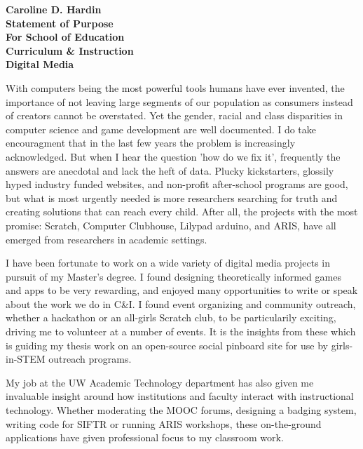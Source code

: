 \documentclass[12pt]{letter}
\begin{document}
\begin{letter}

\noindent 
\large\textbf{Caroline D. Hardin\\
Statement of Purpose\\
For School of Education\\
Curriculum \& Instruction\\
Digital Media
}
\vfill


\signature{Caroline D. Hardin} %


With computers being the most powerful tools humans have ever invented, the importance of not leaving large segments of our population as consumers instead of creators cannot be overstated. Yet the gender, racial and class disparities in computer science and game development are well documented. I do take encouragment that in the last few years the problem is increasingly acknowledged. But when I hear the question 'how do we fix it', frequently the answers are anecdotal and lack the heft of data. Plucky kickstarters, glossily hyped industry funded websites, and non-profit after-school programs are good, but what is most urgently needed is more researchers searching for truth and creating solutions that can reach every child. After all, the projects with the most promise: Scratch, Computer Clubhouse, Lilypad arduino, and ARIS, have all emerged from researchers in academic settings.

I have been fortunate to work on a wide variety of digital media projects in pursuit of my Master's degree. I found designing theoretically informed games and apps to be very rewarding, and enjoyed many opportunities to write or speak about the work we do in C&I. I found event organizing and community outreach, whether a hackathon or an all-girls Scratch club, to be particularily exciting, driving me to volunteer at a number of events. It is the insights from these which is guiding my thesis work on an open-source social pinboard site for use by girls-in-STEM outreach programs.

My job at the UW Academic Technology department has also given me invaluable insight around how institutions and faculty interact with instructional technology. Whether moderating the MOOC forums, designing a badging system, writing code for SIFTR or running ARIS workshops, these on-the-ground applications have given professional focus to my classroom work.


\end{letter}
\end{document}
